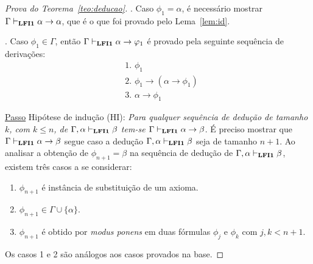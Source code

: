 \begin{proof}[Prova do Teorema~\ref{teo:deducao}]
        . Caso $\phi_{1} = \alpha$, é necessário mostrar $\Gamma \vdash_{\textbf{LFI1}{}} \alpha \to \alpha$, que é o que foi provado pelo Lema~\ref{lem:id}.

        . Caso $\phi_{1} \in \Gamma$, então $\Gamma \vdash_{\textbf{LFI1}{}} \alpha \to \varphi_{1}$ é provado pela seguinte sequência de derivações:
        \begin{align*}
            & \text{1. } \phi_{1} \tag{Premissa}\\
            & \text{2. } \phi_{1} \to (\alpha \to \phi_{1}) \tag{Ax1}\\
            & \text{3. } \alpha \to \phi_{1} \tag{MP 1, 2}
        \end{align*}

        \noindent \underline{Passo} Hipótese de indução (HI): \textit{Para qualquer sequência de dedução de tamanho $k$, com $k \leq n$, de $\Gamma, \alpha \vdash_{\textbf{LFI1}{}} \beta$ tem-se $\Gamma \vdash_{\textbf{LFI1}{}} \alpha \to \beta$}. É preciso mostrar que $\Gamma \vdash_{\textbf{LFI1}{}} \alpha \to \beta$ segue caso a dedução $\Gamma, \alpha \vdash_{\textbf{LFI1}{}} \beta$ seja de tamanho $n + 1$. Ao analisar a obtenção de $\phi_{n + 1} = \beta$ na sequência de dedução de $\Gamma, \alpha\vdash_{\textbf{LFI1}{}} \beta$, existem três casos a se considerar:
        \begin{enumerate}
            \item $\phi_{n + 1}$ é instância de substituição de um axioma.
            \item $\phi_{n + 1} \in \Gamma \cup \{\alpha\}$.
            \item $\phi_{n + 1}$ é obtido por \textit{modus ponens} em duas fórmulas $\phi_{j}$ e $\phi_{k}$ com $j, k < n + 1$.
        \end{enumerate}
        
        \noindent Os casos 1 e 2 são análogos aos casos provados na base.


\end{proof}
